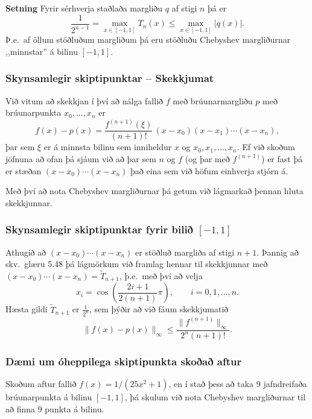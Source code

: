 \documentclass[icelandic,a4paper,12pt]{article}
\begin{document}
 \pause
 \textbf{Setning}
  Fyrir sérhverja staðlaða margliðu $q$ af stigi $n$ þá er 
  $$
    \frac 1{2^{n-1}} = \max_{x\in [-1,1]} T_n(x) \leq \max_{x\in[-1,1]} |q(x)|.
  $$
  \pause
  Þ.e.~af öllum stöðluðum margliðum þá eru stöðluðu Chebyshev margliðurnar ,,minnstar'' 
  á bilinu $[-1,1]$.
 


\subsubsection{Skynsamlegir skiptipunktar -- Skekkjumat}
  Við vitum að skekkjan í því að nálga fallið $f$ með brúunarmargliðu $p$
  með brúunarpunkta $x_0,\ldots,x_n$ er
  $$
    f(x)-p(x) = \frac{f^{(n+1)}(\xi)}{(n+1)!}\, (x-x_0)(x-x_1)\cdots (x-x_n),
  $$
  þar sem $\xi$ er á minnsta bilinu sem inniheldur $x$ og $x_0,x_1,\ldots,x_n$. 
 \pause
 Ef við skoðum jöfnuna að ofan þá sjáum við að þar sem $n$ og $f$ (og þar með $f^{(n+1)}$) er fast
 þá er stæðan $(x-x_0)\cdots(x-x_n)$ það eina sem við höfum einhverja stjórn á. \pause
 
 Með því að nota Chebyshev margliðurnar þá getum við lágmarkað þennan hluta skekkjunnar.



  
\subsubsection{Skynsamlegir skiptipunktar fyrir bilið $[-1,1]$}

Athugið að $(x-x_0)\cdots (x-x_n)$ er stöðluð margliða af stigi $n+1$. Þannig að skv.~glæru 5.48 
þá lágmörkum við  framlag hennar til skekkjunnar með $(x-x_0)\cdots (x-x_n) = \tilde T_{n+1}$, \pause
þ.e.~með því að velja 
$$
x_i = \cos\left(\frac{2i+1}{2(n+1)}\pi\right), \qquad i=0,1,\ldots,n.
$$
\pause 
Hæsta gildi $\tilde T_{n+1}$ er $\frac 1{2^n}$, sem þýðir að við fáum skekkjumatið
$$
\|f(x)-p(x)\|_\infty \leq \frac{\|f^{(n+1)}\|_\infty}{2^n(n+1)!}.
$$

 


\subsubsection{Dæmi um óheppilega skiptipunkta skoðað aftur}
Skoðum aftur fallið 
$f(x) = 1/(25x^2+1)$, en í stað þess að taka 9  jafndreifaða brúunarpunkta
á bilinu $[-1,1]$, þá skulum við nota Chebyshev margliðurnar til að finna 9
punkta á bilinu.
\end{document}
